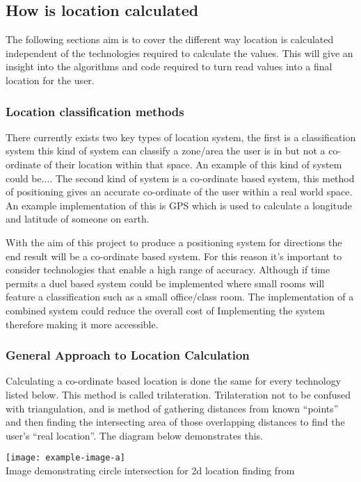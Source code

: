 \subsection{How is location calculated}
The following sections aim is to cover the different way location is calculated independent of the technologies required to calculate the values. This will give an insight into the algorithms and code required to turn read values into a final location for the user. 

\subsubsection{Location classification methods}
There currently exists two key types of location system, the first is a classification system this kind of system can classify a zone/area the user is in but not a co-ordinate of their location within that space. An example of this kind of system could be....
The second kind of system is a co-ordinate based system, this method of positioning gives an accurate co-ordinate of the user within a real world space. An example implementation of this is GPS which is used to calculate a longitude and latitude of someone on earth.

With the aim of this project to produce a positioning system for directions the end result will be a co-ordinate based system. For this reason it's important to consider technologies that enable a high range of accuracy. Although if time permits a duel based system could be implemented where small rooms will feature a classification such as a small office/class room. The implementation of a combined system could reduce the overall cost of Implementing the system therefore making it more accessible.

\subsubsection{General Approach to Location Calculation}
Calculating a co-ordinate based location is done the same for every technology listed below. This method is called trilateration. Trilateration not to be confused with triangulation, and is method of gathering distances from known “points” and then finding the intersecting area of those overlapping distances to find the user’s “real location”. The diagram below demonstrates this.
\begin{center}
	\texttt{[image: example-image-a]}\\
	Image demonstrating circle intersection for 2d location finding from \citetemp
\end{center}

